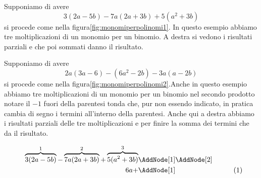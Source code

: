 Supponiamo di avere \[3(2a-5b)-7a(2a+3b)+5(a^2+3b)\]
si  procede come nella figura\nobs\vref{fig:monomiperpolinomi1}. In questo esempio abbiamo tre moltiplicazioni di un monomio per un binomio. A destra si vedono i risultati parziali e che poi sommati danno il risultato.

Supponiamo di avere \[2a(3a-6)-(6a^2-2b)-3a(a-2b)\]
si  procede come nella figura\nobs\vref{fig:monomiperpolinomi2}.Anche in questo esempio abbiamo tre moltiplicazioni di un monomio per un binomio nel secondo prodotto notare il $-1$ fuori della parentesi tonda che, pur non essendo indicato, in pratica cambia di segno i termini all'interno della parentesi. Anche qui a destra abbiamo  i risultati parziali delle tre moltiplicazioni e per finire la somma dei termini che da il risultato.
\begin{figure}
\begin{NodesList}
	\begin{align*}
		\overbrace{3(2a-5b)}^{1}-\overbrace{7a(2a+3b)}^{2}+\overbrace{5(a^2+3b)}^{3}&\AddNode[1]\AddNode[2]\\
		6a+&\AddNode[1]&\tag{1}\\ 

\end{align*}
\end{NodesList}
\end{figure}
